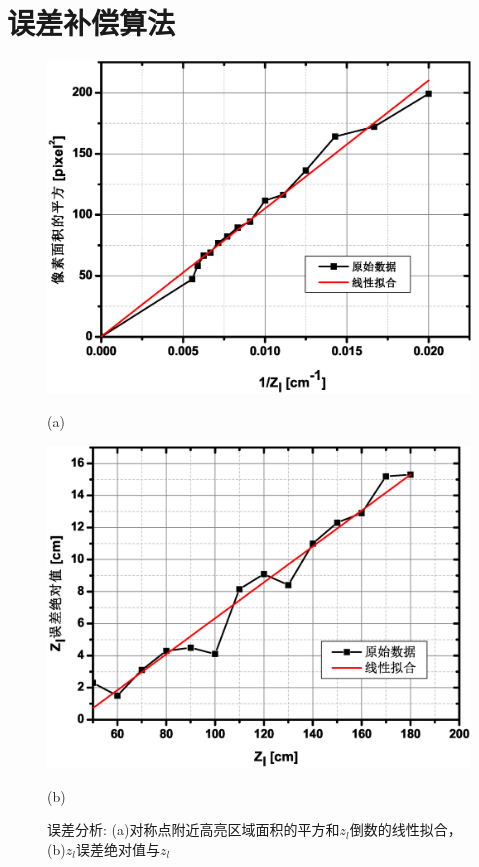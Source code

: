 \section{误差补偿算法}
\begin{figure}[!t]
\begin{minipage}{0.49\linewidth}
  \centerline{\includegraphics[width=\textwidth]{FIG/5-12b.eps}}
  \centerline{(a)}
\end{minipage}
\hfill
\begin{minipage}{0.49\linewidth}
  \centerline{\includegraphics[width=\textwidth]{FIG/5-12a.eps}}
  \centerline{(b)}
\end{minipage}
\vfill
\caption{误差分析: (a)对称点附近高亮区域面积的平方和$z_{l}$倒数的线性拟合，(b)$z_{l}$误差绝对值与$z_{l}$}
\label{fig:erroranlysiszw}
\end{figure}
